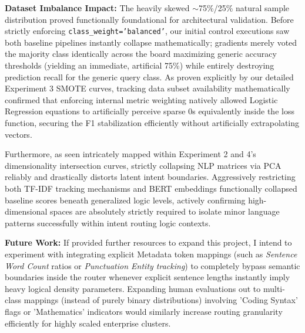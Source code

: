 \documentclass[12pt, a4paper]{article}
\begin{document}
\textbf{Dataset Imbalance Impact:}
The heavily skewed $\sim$75\%/25\% natural sample distribution proved functionally foundational for architectural validation. Before strictly enforcing \texttt{class\_weight='balanced'}, our initial control executions saw both baseline pipelines instantly collapse mathematically; gradients merely voted the majority class identically across the board maximizing generic accuracy thresholds (yielding an immediate, artificial 75\%) while entirely destroying prediction recall for the generic query class. As proven explicitly by our detailed Experiment 3 SMOTE curves, tracking data subset availability mathematically confirmed that enforcing internal metric weighting natively allowed Logistic Regression equations to artificially perceive sparse 0s equivalently inside the loss function, securing the F1 stabilization efficiently without artificially extrapolating vectors.

Furthermore, as seen intricately mapped within Experiment 2 and 4's dimensionality intersection curves, strictly collapsing NLP matrices via PCA reliably and drastically distorts latent intent boundaries. Aggressively restricting both TF-IDF tracking mechanisms and BERT embeddings functionally collapsed baseline scores beneath generalized logic levels, actively confirming high-dimensional spaces are absolutely strictly required to isolate minor language patterns successfully within intent routing logic contexts. 

\textbf{Future Work:}
If provided further resources to expand this project, I intend to experiment with integrating explicit Metadata token mappings (such as \textit{Sentence Word Count} ratios or \textit{Punctuation Entity tracking}) to completely bypass semantic boundaries inside the router whenever explicit sentence lengths instantly imply heavy logical density parameters. Expanding human evaluations out to multi-class mappings (instead of purely binary distributions) involving 'Coding Syntax' flags or 'Mathematics' indicators would similarly increase routing granularity efficiently for highly scaled enterprise clusters.
\end{document}
